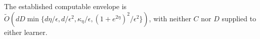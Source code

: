 The established computable envelope is \(\widetilde O(dD\min\{d\eta/\epsilon,d/\epsilon^2,\kappa_\eta/\epsilon,(1+e^{2\eta})^2/\epsilon^2\})\), with neither \(C\) nor \(D\) supplied to either learner.